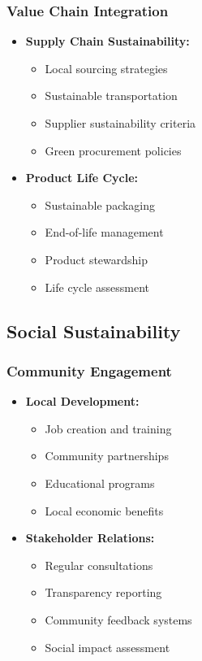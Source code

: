 \subsubsection{Value Chain Integration}
\begin{itemize}
    \item \textbf{Supply Chain Sustainability:}
    \begin{itemize}
        \item Local sourcing strategies
        \item Sustainable transportation
        \item Supplier sustainability criteria
        \item Green procurement policies
    \end{itemize}
    
    \item \textbf{Product Life Cycle:}
    \begin{itemize}
        \item Sustainable packaging
        \item End-of-life management
        \item Product stewardship
        \item Life cycle assessment
    \end{itemize}
\end{itemize}

\subsection{Social Sustainability}

\subsubsection{Community Engagement}
\begin{itemize}
    \item \textbf{Local Development:}
    \begin{itemize}
        \item Job creation and training
        \item Community partnerships
        \item Educational programs
        \item Local economic benefits
    \end{itemize}
    
    \item \textbf{Stakeholder Relations:}
    \begin{itemize}
        \item Regular consultations
        \item Transparency reporting
        \item Community feedback systems
        \item Social impact assessment
    \end{itemize}
\end{itemize}

